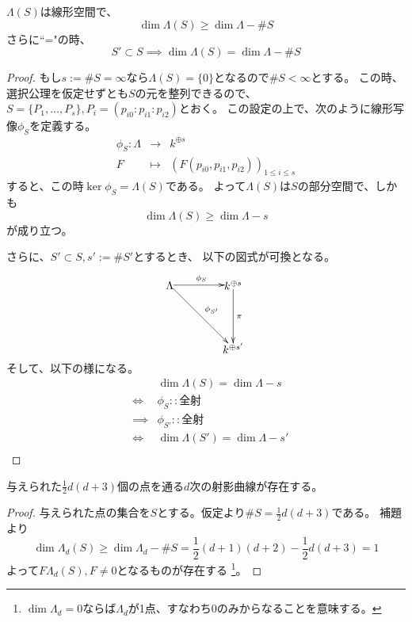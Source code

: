 \documentclass[a4]{article}
\begin{document}
        \begin{Lemma}
            $\Lambda(S)$は線形空間で、
            \[ \dim \Lambda(S) \geq \dim \Lambda - \#S \]
            さらに``="の時、
            \[ S' \subset S \implies \dim \Lambda(S) = \dim \Lambda - \#S \]
        \end{Lemma}
        \begin{proof}
            もし$s:=\#S=\infty$なら$\Lambda(S)=\{0\}$となるので$\#S<\infty$とする。
            この時、選択公理を仮定せずとも$S$の元を整列できるので、
            $S=\{ P_1, \dots, P_s \}, P_i=(p_{i0}: p_{i1}: p_{i2})$とおく。
            この設定の上で、次のように線形写像$\phi_S$を定義する。
            \begin{eqnarray*}
                \phi_S : \Lambda &\to& k^{\oplus s} \\
                F &\mapsto& (F(p_{i0}, p_{i1}, p_{i2}))_{1 \leq i \leq s}
            \end{eqnarray*}
            すると、この時$\operatorname{ker}\phi_S=\Lambda(S)$である。
            よって$\Lambda(S)$は$S$の部分空間で、しかも
            \[ \dim \Lambda(S) \geq \dim \Lambda - s \]
            が成り立つ。

            さらに、$S' \subset S, s':=\#S'$とするとき、
            以下の図式が可換となる。
            \[
                \begin{xy}
                    (0,20) *{\Lambda}="la",
                    (20,20) *{k^{\oplus s}}="ks",
                    (20,0) *{k^{\oplus s'}}="ksd",
                    \ar@{->}^{\phi_S} "la";"ks"
                    \ar@{->}^{\pi} "ks";"ksd"
                    \ar@{->}^{\phi_{S'}} "la";"ksd"
                \end{xy}
            \]
            そして、以下の様になる。
            \begin{eqnarray*}
                &{}& \dim \Lambda(S) = \dim \Lambda - s \\
                &\iff& \phi_S :: \mbox{全射} \\
                &\implies& \phi_{S'} :: \mbox{全射} \\
                &\iff& \dim \Lambda(S') = \dim \Lambda - s' \\
            \end{eqnarray*}
            
        \end{proof}

        \begin{Prop}
            与えられた$\frac{1}{2}d(d+3)$個の点を通る$d$次の射影曲線が存在する。
        \end{Prop}
        \begin{proof}
            与えられた点の集合を$S$とする。仮定より$\#S=\frac{1}{2}d(d+3)$である。
            補題より
            \[ \dim \Lambda_d(S) \geq \dim \Lambda_d - \#S=\frac{1}{2}(d+1)(d+2)-\frac{1}{2}d(d+3)=1 \]
            よって$F \Lambda_d(S), F \neq 0$となるものが存在する
            \footnote{$\dim \Lambda_d=0$ならば$\Lambda_d$が1点、すなわち0のみからなることを意味する。}。
            
        \end{proof}
\end{document}
